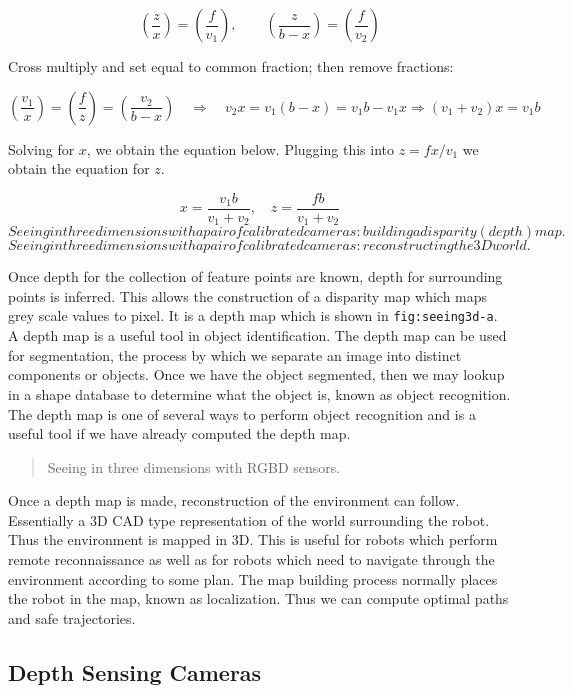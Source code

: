 \[\left(\frac{z}{x}\right) = \left(\frac{f}{v_1}\right),\quad\quad
\left(\frac{z}{b-x}\right)  = \left(\frac{f}{v_2}\right)\]

Cross multiply and set equal to common fraction; then remove fractions:

\[\left(\frac{v_1}{x}\right) = \left(\frac{f}{z}\right) = \left(\frac{v_2}{b-x}\right)
\quad \Rightarrow \quad v_2 x = v_1(b-x) = v_1 b - v_1 x \Rightarrow  (v_1+v_2) x = v_1b\]

Solving for \(x\), we obtain the equation below. Plugging this into
\(z = fx / v_1\) we obtain the equation for \(z\).

\[x = \frac{v_1b}{v_1+v_2}, \quad
z = \frac{fb}{v_1+v_2}\]\[Seeing in three dimensions with a pair of calibrated cameras: building
a disparity (depth) map.\]\[Seeing in three dimensions with a pair of calibrated cameras:
reconstructing the 3D world.\]

Once depth for the collection of feature points are known, depth for
surrounding points is inferred. This allows the construction of a
disparity map which maps grey scale values to pixel. It is a depth map
which is shown in \texttt{fig:seeing3d-a}. A depth map is a useful tool
in object identification. The depth map can be used for segmentation,
the process by which we separate an image into distinct components or
objects. Once we have the object segmented, then we may lookup in a
shape database to determine what the object is, known as object
recognition. The depth map is one of several ways to perform object
recognition and is a useful tool if we have already computed the depth
map.

\begin{quote}
Seeing in three dimensions with RGBD sensors.
\end{quote}

Once a depth map is made, reconstruction of the environment can follow.
Essentially a 3D CAD type representation of the world surrounding the
robot. Thus the environment is mapped in 3D. This is useful for robots
which perform remote reconnaissance as well as for robots which need to
navigate through the environment according to some plan. The map
building process normally places the robot in the map, known as
localization. Thus we can compute optimal paths and safe trajectories.

\hypertarget{depth-sensing-cameras}{%
\subsection{Depth Sensing Cameras}\label{depth-sensing-cameras}}

